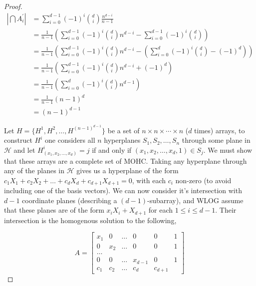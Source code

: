 \documentclass{article}
\begin{document}
\begin{proof}
  \begin{align*}
    |\bigcap A^{\prime}_{i}| &= \sum_{i = 0}^{d - 1} (-1)^{i} \binom{d}{i} \frac{n^{d - i}}{n - 1} \\
                  &= \frac{1}{n - 1}\left(\sum_{i = 0}^{d - 1}{(-1)}^{i} \binom{d}{i} n^{d - i} - \sum_{i = 0}^{d - 1} {(-1)}^{i} \binom{d}{i}\right) \\
                  &= \frac{1}{n - 1}\left(\sum_{i = 0}^{d - 1}{(-1)}^{i} \binom{d}{i} n^{d - i} - \left(\sum_{i = 0}^{d} {(-1)}^{i} \binom{d}{i} - {(-1)}^{d}\right)\right) \\
                  &= \frac{1}{n - 1}\left(\sum_{i = 0}^{d - 1}{(-1)}^{i} \binom{d}{i} n^{d - i} + {(-1)}^{d}\right) \\
                  &= \frac{1}{n - 1}\left(\sum_{i = 0}^{d}{(-1)}^{i} \binom{d}{i} n^{d - 1}\right) \\
                  &= \frac{1}{n - 1}{(n - 1)}^{d} \\
                  &= {(n - 1)}^{d - 1}
  \end{align*}


  Let \(H = \{H^{1}, H^{2}, \ldots, H^{{(n - 1)}^{d - 1}}\}\) be a set of \(n \times n \times \cdots \times n\) (\(d\) times) arrays, to construct \(H^{i}\) one considers all \(n\) hyperplanes \(S_{1}, S_{2}, \ldots, S_{n}\) through some plane in \(\mathcal{H}\) and let \(H^{i}_{(x_{1}, x_{2}, \ldots, x_{d})} = j\) if and only if \((x_{1}, x_{2}, \ldots, x_{d}, 1) \in S_{j}\).
  We must show that these arrays are a complete set of MOHC.
  Taking any hyperplane through any of the planes in \(\mathcal{H}\) gives us a hyperplane of the form \(c_1X_1 + c_2X_2 + \ldots + c_d X_d + c_{d + 1}X_{d + 1} = 0\), with each \(c_i\) non-zero (to avoid including one of the basis vectors).
  We can now consider it's intersection with \(d - 1\) coordinate planes (describing a \((d - 1)\)-subarray), and WLOG assume that these planes are of the form \(x_i X_i + X_{d + 1}\) for each \(1 \leq i \leq d - 1\). Their intersection is the homogenous solution to the following,

  \begin{equation*}
    A = \begin{bmatrix}
      x_1 & 0 & \ldots & 0 & 0 & 1 \\
      0 & x_2 & \ldots & 0 & 0 & 1 \\
      \ldots \\
      0 & 0 & \ldots & x_{d - 1} & 0 & 1 \\
      c_1 & c_2 & \ldots & c_d & c_{d + 1} 
    \end{bmatrix}
  \end{equation*}


\end{proof}
\end{document}
